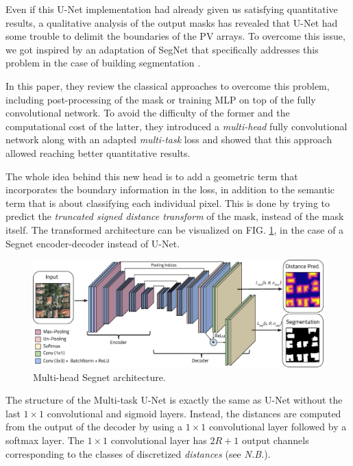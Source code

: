 \documentclass[twocolumn,superscriptaddress,aps,nofootinbib]{revtex4-1}
\begin{document}
Even if this U-Net implementation had already given us satisfying quantitative results, a qualitative analysis of the output masks has revealed that U-Net had some trouble to delimit the boundaries of the PV arrays. To overcome this issue, we got inspired by an adaptation of SegNet that specifically addresses this problem in the case of building segmentation \cite{bischke2019multi}.

In this paper, they review the classical approaches to overcome this problem, including post-processing of the mask or training MLP on top of the fully convolutional network. To avoid the difficulty of the former and the computational cost of the latter, they introduced a \emph{multi-head} fully convolutional network along with an adapted \emph{multi-task} loss and showed that this approach allowed reaching better quantitative results.

The whole idea behind this new head is to add a geometric term that incorporates the boundary information in the loss, in addition to the semantic term that is about classifying each individual pixel. This is done by trying to predict the \emph{truncated signed distance transform} of the mask, instead of the mask itself. The transformed architecture can be visualized on FIG. \ref{fig:multitask_segnet}, in the case of a Segnet encoder-decoder instead of U-Net.

\begin{figure}[h]
    \centering
    \includegraphics[width=\columnwidth]{resources/png/multitask_segnet.png}
    \vspace{-1em}
    \caption{Multi-head Segnet architecture. \cite{bischke2019multi}}
    \vspace{-0.5em}
    \label{fig:multitask_segnet}
\end{figure}

The structure of the Multi-task U-Net is exactly the same as U-Net without the last $1 \times 1$ convolutional and sigmoid layers. Instead, the distances are computed from the output of the decoder by using a $1 \times 1$ convolutional layer followed by a softmax layer. The $1 \times 1$ convolutional layer has $2R + 1$ output channels corresponding to the classes of discretized \emph{distances} (see \emph{N.B.}).
\end{document}
